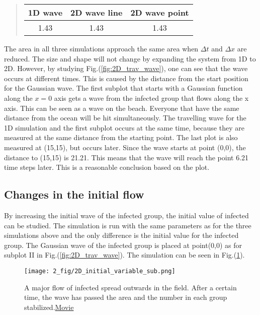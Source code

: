 \documentclass[%
twoside,                 %
final,                   %
chapterprefix=true,      %
open=right               %
10pt]{book}
\begin{document}
\label{table:wave_values}

\begin{quote}
\begin{tabular}{ccc}
\hline
\multicolumn{1}{c}{ 1D wave } & \multicolumn{1}{c}{ 2D wave line } & \multicolumn{1}{c}{ 2D wave point } \\
\hline
1.43    & 1.43         & 1.43          \\
\hline
\end{tabular}
\end{quote}

\noindent
The area in all three simulations approach the same area when $\Delta t$ and $\Delta x$ are reduced. The size and shape will not change by  expanding the system from 1D to 2D. However, by studying Fig.(\ref{fig:2D_trav_wave}), one can see that the wave occurs at different times. This is caused by the distance from the start position for the Gaussian wave. The first subplot that starts with a Gaussian function along the $x=0$ axis gets a wave from the infected group that flows along the x axis. This can be seen as a wave on the beach. Everyone that have the same distance from the ocean will be hit simultaneously. The travelling wave for the 1D simulation and the first subplot occurs at the same time, because they are measured at the same distance from the starting point. The last plot is also measured at (15,15), but occurs later. Since the wave starts at point (0,0), the distance to (15,15) is 21.21. This means that the wave will reach the point 6.21 time steps later. This is a reasonable conclusion based on the plot.    

\subsection{Changes in the initial flow}
By increasing the initial wave of the infected group, the initial value of infected can be studied. The simulation is run with the same parameters as for the three simulations above and the only difference is the initial value for the infected group. The Gaussian wave of the infected group is placed at point(0,0) as for subplot II in Fig.(\ref{fig:2D_trav_wave}). The simulation can be seen in Fig.(\ref{fig:initial_value}).  


\begin{figure}[ht]
  \centerline{\texttt{[image: 2\_fig/2D\_initial\_variable\_sub.png]}}
  \caption{
  \label{fig:initial_value} A major flow of infected spread outwards in the field. After a certain time, the wave has passed the area and the number in each group stabilized.\href{{https://torbjornseland.github.io/master}}{Movie}
  }
\end{figure}
\end{document}
